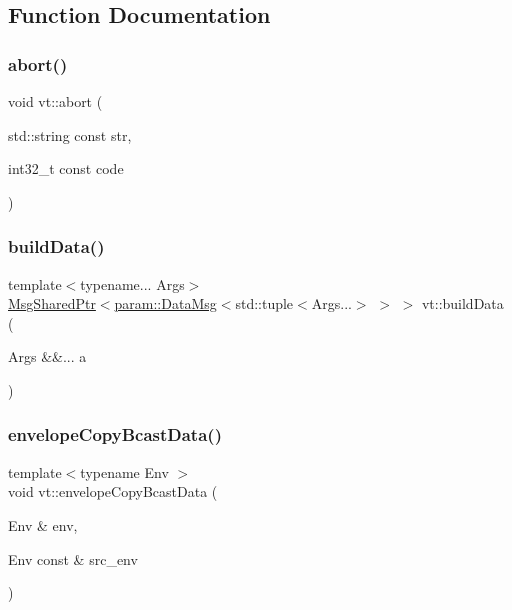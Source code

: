 \subsection{Function Documentation}
\mbox{\label{namespacevt_ad36ca8eb7e5b9cc794a793b290b9c2c7}} 
\subsubsection{\texorpdfstring{abort()}{abort()}}
{\footnotesize\ttfamily void vt\+::abort (\begin{DoxyParamCaption}\item[{std\+::string const}]{str,  }\item[{int32\+\_\+t const}]{code }\end{DoxyParamCaption})}

\mbox{\label{namespacevt_a59494f92a4811ae4f2b5264a50aa78dd}} 
\subsubsection{\texorpdfstring{build\+Data()}{buildData()}}
{\footnotesize\ttfamily template$<$typename... Args$>$ \\
\hyperlink{namespacevt_ab2b3d506ec8e8d1540aede826d84a239}{Msg\+Shared\+Ptr}$<$\hyperlink{structvt_1_1param_1_1_data_msg}{param\+::\+Data\+Msg}$<$std\+::tuple$<$Args...$>$ $>$ $>$ vt\+::build\+Data (\begin{DoxyParamCaption}\item[{Args \&\&...}]{a }\end{DoxyParamCaption})}

\mbox{\label{namespacevt_a16caa74ca477155c59de62474b2e1f89}} 
\subsubsection{\texorpdfstring{envelope\+Copy\+Bcast\+Data()}{envelopeCopyBcastData()}}
{\footnotesize\ttfamily template$<$typename Env $>$ \\
void vt\+::envelope\+Copy\+Bcast\+Data (\begin{DoxyParamCaption}\item[{Env \&}]{env,  }\item[{Env const \&}]{src\+\_\+env }\end{DoxyParamCaption})\hspace{0.3cm}{\ttfamily [inline]}}



